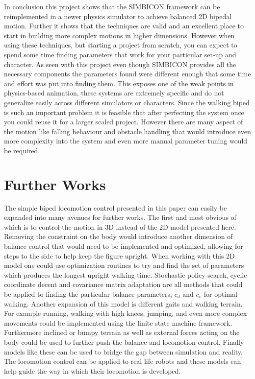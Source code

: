 \documentclass[12pt, a4paper]{article}
\begin{document}
In conclusion this project shows that the SIMBICON framework can be reimplemented in a newer physics simulator to achieve balanced 2D bipedal motion. Further it shows that the techniques are valid and an excellent place to start in building more complex motions in higher dimensions. However when using these techniques, but starting a project from scratch, you can expect to spend some time finding parameters that work for your particular set-up and character. As seen with this project even though SIMBICON provides all the necessary components the parameters found were different enough that some time and effort was put into finding them. This exposes one of the weak points in physics-based animation, these systems are extremely specific and do not generalize easily across different simulators or characters. Since the walking biped is such an important problem it is feasible that after perfecting the system once you could reuse it for a larger scaled project. However there are many aspect of the motion like falling behaviour and obstacle handling that would introduce even more complexity into the system and even more manual parameter tuning would be required. 

\newpage
\section{Further Works}
The simple biped locomotion control presented in this paper can easily be expanded into many avenues for further works. The first and most obvious of which is to control the motion in 3D instead of the 2D model presented here. Removing the constraint on the body would introduce another dimension of balance control that would need to be implemented and optimized, allowing for steps to the side to help keep the figure upright. When working with this 2D model one could use optimization routines to try and find the set of parameters which produces the longest upright walking time. Stochastic policy search, cyclic coordinate decent and covariance matrix adaptation are all methods that could be applied to finding the particular balance parameters, $c_d$ and $c_v$ for optimal walking. Another expansion of this model is different gaits and walking terrain. For example running, walking with high knees, jumping, and even more complex movements could be implemented using the finite state machine framework. Furthermore inclined or bumpy terrain as well as external forces acting on the body could be used to further push the balance and locomotion control. Finally models like these can be used to bridge the gap between simulation and reality. The locomotion control can be applied to real life robots and these models can help guide the way in which their locomotion is developed. 
\end{document}
